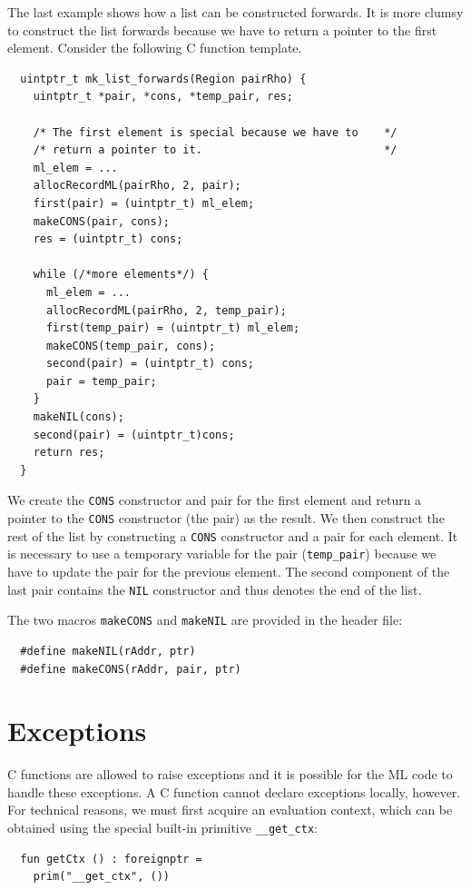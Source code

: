 \documentclass[12pt]{book}
\begin{document}
The last example shows how a list can be constructed forwards. It is more
clumsy to construct the list forwards because we have to return a pointer
to the first element. Consider the following C function template.
%
\begin{verbatim}
  uintptr_t mk_list_forwards(Region pairRho) {
    uintptr_t *pair, *cons, *temp_pair, res;

    /* The first element is special because we have to    */
    /* return a pointer to it.                            */
    ml_elem = ...
    allocRecordML(pairRho, 2, pair);
    first(pair) = (uintptr_t) ml_elem;
    makeCONS(pair, cons);
    res = (uintptr_t) cons;

    while (/*more elements*/) {
      ml_elem = ...
      allocRecordML(pairRho, 2, temp_pair);
      first(temp_pair) = (uintptr_t) ml_elem;
      makeCONS(temp_pair, cons);
      second(pair) = (uintptr_t) cons;
      pair = temp_pair;
    }
    makeNIL(cons);
    second(pair) = (uintptr_t)cons;
    return res;
  }
\end{verbatim}

We create the \texttt{CONS} constructor and pair for the first element
and return a pointer to the \texttt{CONS} constructor (the pair) as
the result. We then construct the rest of the list by constructing a
\texttt{CONS} constructor and a pair for each element. It is necessary
to use a temporary variable for the pair (\verb|temp_pair|) because we
have to update the pair for the previous element. The second component
of the last pair contains the \texttt{NIL} constructor and thus
denotes the end of the list.

The two macros \texttt{makeCONS} and \texttt{makeNIL} are provided in
the  header file:
%
%
\begin{verbatim}
  #define makeNIL(rAddr, ptr)
  #define makeCONS(rAddr, pair, ptr)
\end{verbatim}

\section{Exceptions}
\label{C_exceptions.sec}
C functions are allowed to raise exceptions and it is possible for the
ML code to handle these exceptions. A C function cannot declare
exceptions locally, however. For technical reasons, we must
first acquire an
%
%
evaluation context, which can be obtained using the
special built-in primitive \texttt{\_\_get\_ctx}:
\begin{verbatim}
  fun getCtx () : foreignptr =
    prim("__get_ctx", ())
\end{verbatim}
\end{document}
